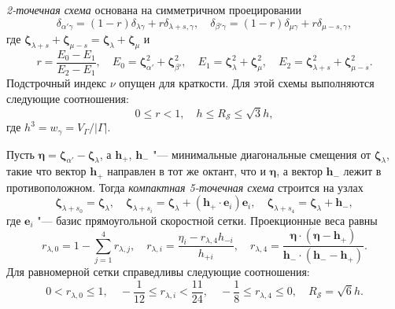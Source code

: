 \documentclass[
aps,%
12pt,%
final,%
notitlepage,%
oneside,%
onecolumn,%
nobibnotes,%
nofootinbib,%
superscriptaddress,%
noshowpacs,%
showkeys,%
floatfix,%
tightenlines,%
centertags]%
{revtex4}
\newcommand{\bzeta}{\boldsymbol{\zeta}}
\newcommand{\bh}{\boldsymbol{h}}
\newcommand{\be}{\boldsymbol{e}}
\begin{document}
\emph{2-точечная схема} основана на симметричном проецировании
\begin{equation}\label{eq:uniform_projection}
    \delta_{\alpha'\gamma} = (1-r)\delta_{\lambda\gamma} + r\delta_{\lambda+s,\gamma}, \quad
    \delta_{\beta'\gamma} = (1-r)\delta_{\mu\gamma} + r\delta_{\mu-s,\gamma},
\end{equation}
где \(\bzeta_{\lambda+s} + \bzeta_{\mu-s} = \bzeta_{\lambda} + \bzeta_{\mu}\) и
\begin{equation}\label{eq:stencil_weights2}
    r = \frac{E_0-E_1}{E_2-E_1}, \quad
    E_0 = \bzeta_{\alpha'}^2 + \bzeta_{\beta'}^2, \quad
    E_1 = \bzeta_{\lambda}^2 + \bzeta_{\mu}^2, \quad
    E_2 = \bzeta_{\lambda+s}^2 + \bzeta_{\mu-s}^2.
\end{equation}
Подстрочный индекс \(\nu\) опущен для краткости.
Для этой схемы выполняются следующие соотношения:
\begin{equation}\label{eq:weights_ranges2}
    0 \leq r < 1, \quad h \leq R_{\mathcal{S}} \leq \sqrt3h,
\end{equation}
где \(h^3 = w_\gamma = V_\Gamma/|\Gamma|\).

Пусть \(\boldsymbol{\eta} = \bzeta_{\alpha'} - \bzeta_{\lambda}\),
а \(\bh_+\), \(\bh_-\) "--- минимальные диагональные смещения от \(\bzeta_{\lambda}\),
такие что вектор \(\bh_+\) направлен в тот же октант, что и \(\boldsymbol{\eta}\),
а вектор \(\bh_-\) лежит в противоположном.
Тогда \emph{компактная 5-точечная схема} строится на узлах
\begin{equation}\label{eq:stencil_nodes5}
    \bzeta_{\lambda+s_0} = \bzeta_{\lambda}, \quad
    \bzeta_{\lambda+s_i} = \bzeta_{\lambda} + (\bh_+\cdot \be_i)\be_i, \quad
    \bzeta_{\lambda+s_4} = \bzeta_{\lambda} + \bh_-,
\end{equation}
где \(\be_i\) "--- базис прямоугольной скоростной сетки. Проекционные веса равны
\begin{equation}\label{eq:stencil_weights5}
    r_{\lambda,0} = 1 - \sum_{j=1}^4 r_{\lambda,j}, \quad
    r_{\lambda,i} = \frac{\eta_i - r_{\lambda,4}h_{-i}}{h_{+i}}, \quad
    r_{\lambda,4} = \frac{\boldsymbol{\eta}\cdot(\boldsymbol{\eta} - \bh_+)}
        {\bh_-\cdot(\bh_- - \bh_+)}.
\end{equation}
Для равномерной сетки справедливы следующие соотношения:
\begin{equation}\label{eq:weights_ranges5}
    0 < r_{\lambda,0} \leq 1, \quad
    -\frac1{12} \leq r_{\lambda,i} < \frac{11}{24}, \quad
    -\frac18 \leq r_{\lambda,4} \leq 0, \quad
    R_\mathcal{S} = \sqrt6h.
\end{equation}
\end{document}
